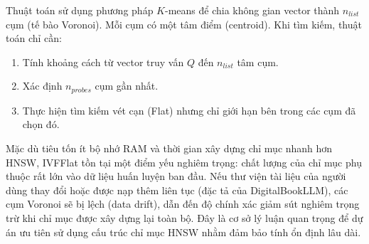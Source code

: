 Thuật toán sử dụng phương pháp $K$-means để chia không gian vector thành $n_{list}$ cụm (tế bào Voronoi). Mỗi cụm có một tâm điểm (centroid). Khi tìm kiếm, thuật toán chỉ cần:

\begin{enumerate}
    \item Tính khoảng cách từ vector truy vấn $Q$ đến $n_{list}$ tâm cụm.
    \item Xác định $n_{probes}$ cụm gần nhất.
    \item Thực hiện tìm kiếm vét cạn (Flat) nhưng chỉ giới hạn bên trong các cụm đã chọn đó.
\end{enumerate}

Mặc dù tiêu tốn ít bộ nhớ RAM và thời gian xây dựng chỉ mục nhanh hơn HNSW, IVFFlat tồn tại một điểm yếu nghiêm trọng: chất lượng của chỉ mục phụ thuộc rất lớn vào dữ liệu huấn luyện ban đầu. Nếu thư viện tài liệu của người dùng thay đổi hoặc được nạp thêm liên tục (đặc tả của DigitalBookLLM), các cụm Voronoi sẽ bị lệch (data drift), dẫn đến độ chính xác giảm sút nghiêm trọng trừ khi chỉ mục được xây dựng lại toàn bộ. Đây là cơ sở lý luận quan trọng để dự án ưu tiên sử dụng cấu trúc chỉ mục HNSW nhằm đảm bảo tính ổn định lâu dài. \cite{malkov2018efficient,johnson2019billion,pgvector2023}